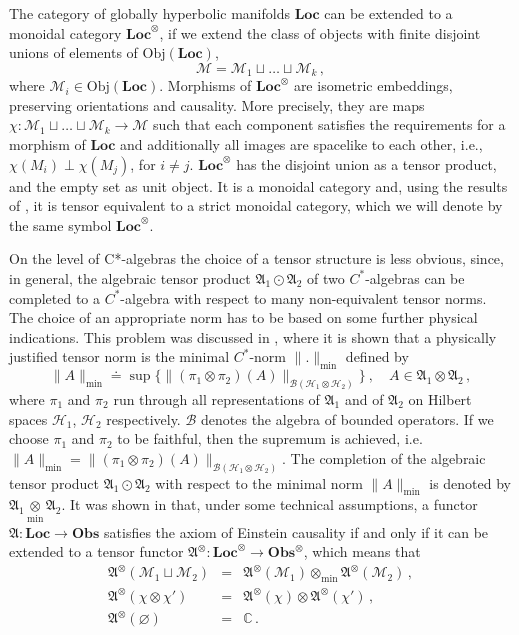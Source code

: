 \documentclass[12pt]{article}
\newcommand{\fA}{\mathfrak{A}}
\newcommand{\Bcal}{\mathcal {B}}
\newcommand{\Hcal}{\mathcal{H}}
\newcommand{\Mcal}{\mathcal{M}}
\newcommand{\obj}{\mathrm{Obj}}
\newcommand{\Loc}{\mathrm{\mathbf{Loc}}}       %
\newcommand{\Obs}{\mathrm{\mathbf{Obs}}}       %
\newcommand{\CC}{\mathbb{C}}           %
\newcommand{\sst}[1]{\scriptscriptstyle{#1}}  %
\newcommand{\1}{\mathds{1}}                         %
\begin{document}
The category of globally hyperbolic manifolds $\Loc$ can be extended to a monoidal category $\Loc^\otimes$, if we extend the class of objects with finite disjoint unions of elements of $\obj(\Loc)$, 
\[\Mcal=\Mcal_1\sqcup \ldots\sqcup \Mcal_k\,,
\] 
where $\Mcal_i\in\obj(\Loc)$. Morphisms of $\Loc^\otimes$ are isometric embeddings, preserving orientations and causality. More precisely, they are maps $\chi: \Mcal_1\sqcup \ldots\sqcup \Mcal_k\rightarrow  \Mcal$ such that each component satisfies the requirements for a morphism of $\Loc$ and additionally all images are spacelike to each other, i.e., $\chi(M_i) \perp\chi(M_j)$, for $i\neq j$. $\Loc^\otimes$ has the disjoint union as a tensor product, and the empty set as unit object. It is a monoidal category and, using the results of \cite{JoSt}, it is tensor equivalent to a strict monoidal category, which we will denote by the same symbol $\Loc^\otimes$.

On the level of C*-algebras the choice of a tensor structure is less obvious, since, in general, the algebraic tensor product $\fA_1\odot\fA_2$ of two $C^*$-algebras can be completed to a $C^*$-algebra with respect to many non-equivalent tensor norms. The choice of an appropriate norm has to be based on some further physical indications. This problem was discussed in \cite{BFIR}, where it is shown that  
a physically justified tensor norm is the minimal $C^*$-norm $\|.\|_{\textrm{min}}$ defined by
\[
\|A\|_{\textrm{min}} \doteq \sup\{\|(\pi_1\otimes\pi_2)(A)\|_{\Bcal(\Hcal_1\otimes\Hcal_2)}\}\ , \quad A\in\fA_1\otimes\fA_2\,,
\]
where $\pi_1$ and $\pi_2$ run through all representations of $\fA_1$ and of $\fA_2$ on Hilbert spaces $\Hcal_1$, $\Hcal_2$ respectively. $\Bcal$ denotes the algebra of bounded operators. If we choose $\pi_1$ and $\pi_2$ to be faithful, then the
supremum is achieved, i.e. $\|A\|_{\textrm{min}}=\|(\pi_1\otimes\pi_2)(A)\|_{\Bcal(\Hcal_1\otimes\Hcal_2)}$.
The completion of the algebraic tensor product $\fA_1\odot\fA_2$  with respect to the minimal norm $\|A\|_{\textrm{min}}$ is denoted by $\fA_1\underset{\sst{\textrm{min}}}{\otimes}\fA_2$. It was shown in \cite{BFIR} that, under some technical assumptions, %
a functor $\fA:\Loc\rightarrow\Obs$ satisfies the axiom of Einstein causality if and only if it can be extended to a tensor functor $\fA^\otimes:\Loc^\otimes\rightarrow\Obs^\otimes$, which means that
\begin{eqnarray}
\fA^\otimes\left(\Mcal_1\sqcup \Mcal_2\right)&=&\fA^\otimes(\Mcal_1)\otimes_{\textrm{min}}\fA^\otimes(\Mcal_2)\,,\\
\fA^\otimes(\chi\otimes\chi')&=&\fA^\otimes(\chi)\otimes\fA^\otimes(\chi')\,,\\
\fA^\otimes(\varnothing)&=&\CC\,.
\end{eqnarray}
\end{document}
